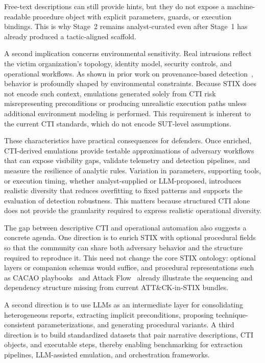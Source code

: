\documentclass[sigconf]{acmart}
\newcommand{\stix}{STIX\xspace}
\newcommand{\attack}{ATT\&CK\xspace}
\begin{document}
Free-text descriptions can still provide hints, but they do not expose a machine-readable procedure object with explicit parameters, guards, or execution bindings. This is why Stage~2 remains analyst-curated even after Stage~1 has already produced a tactic-aligned scaffold.

A second implication concerns environmental sensitivity. Real intrusions reflect the victim organization's topology, identity model, security controls, and operational workflows. As shown in prior work on provenance-based detection~\cite{milajerdi2019holmes,han2020unicorn,10646725}, behavior is profoundly shaped by environmental constraints. Because \stix{} does not encode such context, emulations generated solely from CTI risk misrepresenting preconditions or producing unrealistic execution paths unless additional environment modeling is performed. This requirement is inherent to the current CTI standards, which do not encode SUT-level assumptions.

These characteristics have practical consequences for defenders. Once enriched, CTI-derived emulations provide testable approximations of adversary workflows that can expose visibility gaps, validate telemetry and detection pipelines, and measure the resilience of analytic rules. Variation in parameters, supporting tools, or execution timing, whether analyst-supplied or LLM-proposed, introduces realistic diversity that reduces overfitting to fixed patterns and supports the evaluation of detection robustness. This matters because structured CTI alone does not provide the granularity required to express realistic operational diversity.

The gap between descriptive CTI and operational automation also suggests a concrete agenda. One direction is to enrich \stix{} with optional procedural fields so that the community can share both adversary behavior and the structure required to reproduce it. This need not change the core \stix{} ontology: optional layers or companion schemas would suffice, and procedural representations such as CACAO playbooks~\cite{cacao2spec} and Attack Flow~\cite{attackflowctid} already illustrate the sequencing and dependency structure missing from current \attack{}-in-\stix{} bundles.

A second direction is to use LLMs as an intermediate layer for consolidating heterogeneous reports, extracting implicit preconditions, proposing technique-consistent parameterizations, and generating procedural variants. A third direction is to build standardized datasets that pair narrative descriptions, CTI objects, and executable steps, thereby enabling benchmarking for extraction pipelines, LLM-assisted emulation, and orchestration frameworks.
\end{document}
